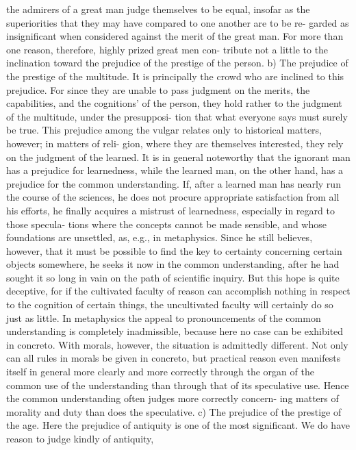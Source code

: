 the admirers of a great man judge themselves to be equal, insofar as the
superiorities that they may have compared to one another are to be re-
garded as insignificant when considered against the merit of the great
man. For more than one reason, therefore, highly prized great men con-
tribute not a little to the inclination toward the prejudice of the prestige of
the person.
b) The prejudice of the prestige of the multitude. It is principally the crowd
who are inclined to this prejudice. For since they are unable to pass
judgment on the merits, the capabilities, and the cognitions' of the person,
they hold rather to the judgment of the multitude, under the presupposi-
tion that what everyone says must surely be true. This prejudice among
the vulgar relates only to historical matters, however; in matters of reli-
gion, where they are themselves interested, they rely on the judgment of
the learned.
It is in general noteworthy that the ignorant man has a prejudice for
learnedness, while the learned man, on the other hand, has a prejudice for
the common understanding.
If, after a learned man has nearly run the course of the sciences, he
does not procure appropriate satisfaction from all his efforts, he finally
acquires a mistrust of learnedness, especially in regard to those specula-
tions where the concepts cannot be made sensible, and whose foundations
are unsettled, as, e.g., in metaphysics. Since he still believes, however, that
it must be possible to find the key to certainty concerning certain objects
somewhere, he seeks it now in the common understanding, after he had
sought it so long in vain on the path of scientific inquiry.
But this hope is quite deceptive, for if the cultivated faculty of reason
can accomplish nothing in respect to the cognition of certain things, the
uncultivated faculty will certainly do so just as little. In metaphysics the
appeal to pronouncements of the common understanding is completely
inadmissible, because here no case can be exhibited in concreto. With
morals, however, the situation is admittedly different. Not only can all
rules in morals be given in concreto, but practical reason even manifests
itself in general more clearly and more correctly through the organ of the
common use of the understanding than through that of its speculative use.
Hence the common understanding often judges more correctly concern-
ing matters of morality and duty than does the speculative.
c) The prejudice of the prestige of the age. Here the prejudice of antiquity is
one of the most significant. We do have reason to judge kindly of antiquity,
